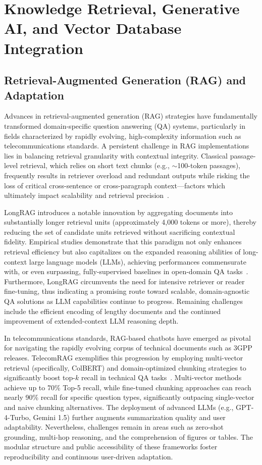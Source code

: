 \section{Knowledge Retrieval, Generative AI, and Vector Database Integration}

\subsection{Retrieval-Augmented Generation (RAG) and Adaptation}

Advances in retrieval-augmented generation (RAG) strategies have fundamentally transformed domain-specific question answering (QA) systems, particularly in fields characterized by rapidly evolving, high-complexity information such as telecommunications standards. A persistent challenge in RAG implementations lies in balancing retrieval granularity with contextual integrity. Classical passage-level retrieval, which relies on short text chunks (e.g., \(\sim\)100-token passages), frequently results in retriever overload and redundant outputs while risking the loss of critical cross-sentence or cross-paragraph context---factors which ultimately impact scalability and retrieval precision~\cite{ref34}.

LongRAG introduces a notable innovation by aggregating documents into substantially longer retrieval units (approximately 4,000 tokens or more), thereby reducing the set of candidate units retrieved without sacrificing contextual fidelity. Empirical studies demonstrate that this paradigm not only enhances retrieval efficiency but also capitalizes on the expanded reasoning abilities of long-context large language models (LLMs), achieving performances commensurate with, or even surpassing, fully-supervised baselines in open-domain QA tasks~\cite{ref34}. Furthermore, LongRAG circumvents the need for intensive retriever or reader fine-tuning, thus indicating a promising route toward scalable, domain-agnostic QA solutions as LLM capabilities continue to progress. Remaining challenges include the efficient encoding of lengthy documents and the continued improvement of extended-context LLM reasoning depth.

In telecommunications standards, RAG-based chatbots have emerged as pivotal for navigating the rapidly evolving corpus of technical documents such as 3GPP releases. TelecomRAG exemplifies this progression by employing multi-vector retrieval (specifically, ColBERT) and domain-optimized chunking strategies to significantly boost top-\(k\) recall in technical QA tasks~\cite{ref20}. Multi-vector methods achieve up to 70\% Top-5 recall, while fine-tuned chunking approaches can reach nearly 90\% recall for specific question types, significantly outpacing single-vector and naive chunking alternatives. The deployment of advanced LLMs (e.g., GPT-4-Turbo, Gemini 1.5) further augments summarization quality and user adaptability. Nevertheless, challenges remain in areas such as zero-shot grounding, multi-hop reasoning, and the comprehension of figures or tables. The modular structure and public accessibility of these frameworks foster reproducibility and continuous user-driven adaptation.

